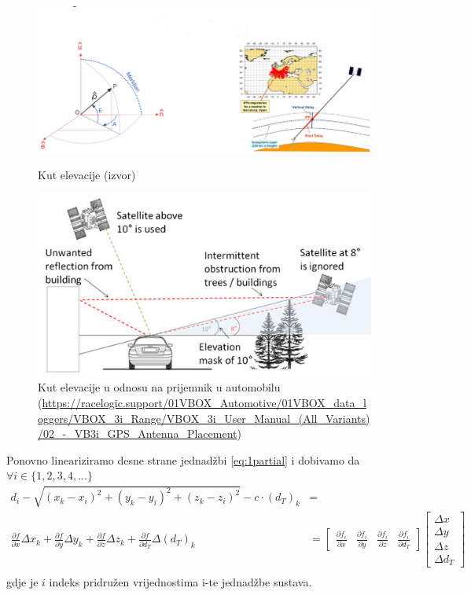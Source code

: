 \documentclass[a4paper,twoside,12pt]{memoir} %
\begin{document}
\begin{figure}[H]
	\begin{minipage}{0.9\textwidth}
		\centering
		\includegraphics[width=1\textwidth]{elev}
		\caption{Kut elevacije (izvor)}
		\label{fig:elev}
	\end{minipage}
	\begin{minipage}{0.9\textwidth}
		\centering
		\includegraphics[width=1\textwidth]{elevBetter}
		\caption{Kut elevacije u odnosu na prijemnik u automobilu (\url{https://racelogic.support/01VBOX_Automotive/01VBOX_data_loggers/VBOX_3i_Range/VBOX_3i_User_Manual_(All_Variants)/02_-_VB3i_GPS_Antenna_Placement})}
		\label{fig:elevBetter}
	\end{minipage}
\end{figure}%

Ponovno lineariziramo desne strane jednadžbi \ref{eq:1partial} i dobivamo da $\forall i \in \{1,2,3,4, ...\}$
\begin{align*}
d_i - \sqrt{(x_k-x_i)^{2}+(y_k-y_i)^{2}+(z_k-z_i)^{2}} - c\cdot (d_T)_k & = \\
\frac{\partial f}{\partial x}\Delta x_k + \frac{\partial f}{\partial y}\Delta y_k + \frac{\partial f}{\partial z}\Delta z_k + \frac{\partial f}{\partial d_T}\Delta (d_T)_k &= 
\begin{bmatrix}
\frac{\partial f_i}{\partial x} &
\frac{\partial f_i}{\partial y} &
\frac{\partial f_i}{\partial z} &
\frac{\partial f_i}{\partial d_T}
\end{bmatrix}
\begin{bmatrix}
\Delta x \\
\Delta y \\
\Delta z \\
\Delta d_T
\end{bmatrix} \\ 
\end{align*}
gdje je $i$ indeks pridružen vrijednostima i-te jednadžbe sustava.
\end{document}
